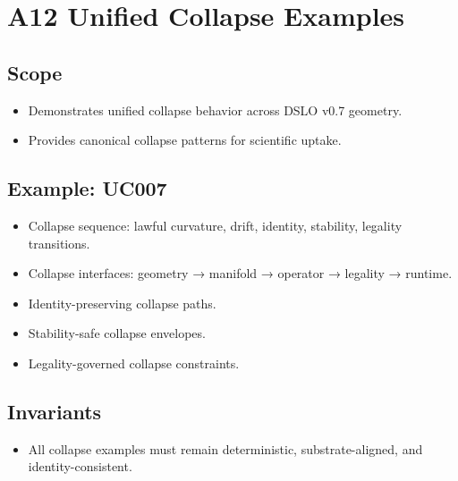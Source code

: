 \section{A12 Unified Collapse Examples}

\subsection{Scope}
\begin{itemize}
    \item Demonstrates unified collapse behavior across DSLO v0.7 geometry.
    \item Provides canonical collapse patterns for scientific uptake.
\end{itemize}

\subsection{Example: UC007}
\begin{itemize}
    \item Collapse sequence: lawful curvature, drift, identity, stability, legality transitions.
    \item Collapse interfaces: geometry → manifold → operator → legality → runtime.
    \item Identity-preserving collapse paths.
    \item Stability-safe collapse envelopes.
    \item Legality-governed collapse constraints.
\end{itemize}

\subsection{Invariants}
\begin{itemize}
    \item All collapse examples must remain deterministic, substrate-aligned, and identity-consistent.
\end{itemize}
